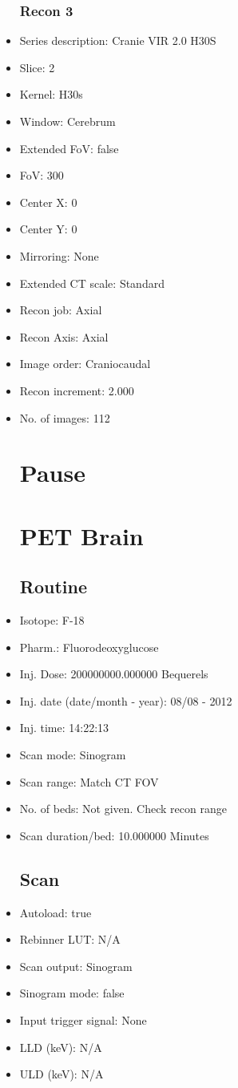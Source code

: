 \documentclass[12pt]{article}
\begin{document}
\begin{itemize}
\subsubsection{Recon 3}
\item Series description: Cranie VIR 2.0 H30S
\item Slice: 2
\item Kernel: H30s
\item Window: Cerebrum
\item Extended FoV: false
\item FoV: 300
\item Center X: 0
\item Center Y: 0
\item Mirroring: None
\item Extended CT scale: Standard
\item Recon job: Axial
\item Recon Axis: Axial
\item Image order: Craniocaudal
\item Recon increment: 2.000
\item No. of images: 112
\section{Pause}
\section{PET Brain}\subsection{Routine}
\item Isotope: F-18
\item Pharm.: Fluorodeoxyglucose
\item Inj. Dose: 200000000.000000 Bequerels
\item Inj. date (date/month - year): 08/08 - 2012
\item Inj. time: 14:22:13
\item Scan mode: Sinogram
\item Scan range: Match CT FOV
\item No. of beds: Not given. Check recon range
\item Scan duration/bed: 10.000000 Minutes
\subsection{Scan}
\item Autoload: true
\item Rebinner LUT: N/A
\item Scan output: Sinogram
\item Sinogram mode: false
\item Input trigger signal: None
\item LLD (keV): N/A
\item ULD (keV): N/A

\end{itemize}
\end{document}
